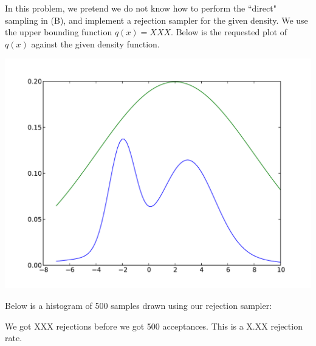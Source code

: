 \documentclass[solution, letterpaper]{cs121}
\begin{document}
\begin{empfile}
\subproblem %
In this problem, we pretend we do not know how to perform the ``direct" sampling in (B), and implement a rejection sampler for the given density. We use the upper bounding function $q(x) = XXX$. Below is the requested plot of $q(x)$ against the given density function.
\begin{center}
\includegraphics[scale=0.8]{mixture-w-envelope.pdf}
\end{center}

Below is a histogram of 500 samples drawn using our rejection sampler:
\begin{center}
\end{center}

We got XXX rejections before we got 500 acceptances. This is a X.XX rejection rate.

\end{empfile}

\immediate{}
\end{document}
